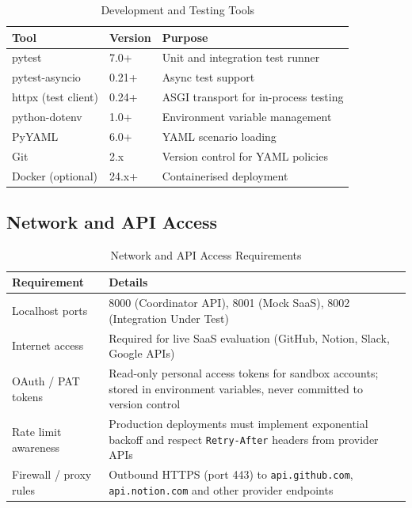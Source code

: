 \documentclass[12pt,a4paper]{report}
\begin{document}
\begin{table}[H]
    \centering
    \caption{Development and Testing Tools}
    \label{tab:dev-tools}
    \begin{tabular}{lll}
        \toprule
        \textbf{Tool}              & \textbf{Version}     & \textbf{Purpose}                         \\
        \midrule
        pytest                     & 7.0+                 & Unit and integration test runner          \\[4pt]
        pytest-asyncio             & 0.21+                & Async test support                        \\[4pt]
        httpx (test client)        & 0.24+                & ASGI transport for in-process testing     \\[4pt]
        python-dotenv              & 1.0+                 & Environment variable management           \\[4pt]
        PyYAML                     & 6.0+                 & YAML scenario loading                     \\[4pt]
        Git                        & 2.x                  & Version control for YAML policies         \\[4pt]
        Docker (optional)          & 24.x+                & Containerised deployment                  \\
        \bottomrule
    \end{tabular}
\end{table}

\subsection{Network and API Access}

\begin{table}[H]
    \centering
    \caption{Network and API Access Requirements}
    \label{tab:network}
    \begin{tabular}{lp{9cm}}
        \toprule
        \textbf{Requirement}           & \textbf{Details}                                                          \\
        \midrule
        Localhost ports                & 8000 (Coordinator API), 8001 (Mock SaaS), 8002 (Integration Under Test)  \\[4pt]
        Internet access                & Required for live SaaS evaluation (GitHub, Notion, Slack, Google APIs)   \\[4pt]
        OAuth / PAT tokens             & Read-only personal access tokens for sandbox accounts; stored in environment variables, never committed to version control \\[4pt]
        Rate limit awareness           & Production deployments must implement exponential backoff and respect \texttt{Retry-After} headers from provider APIs \\[4pt]
        Firewall / proxy rules         & Outbound HTTPS (port 443) to \texttt{api.github.com}, \texttt{api.notion.com} and other provider endpoints \\
        \bottomrule
    \end{tabular}
\end{table}
\end{document}
